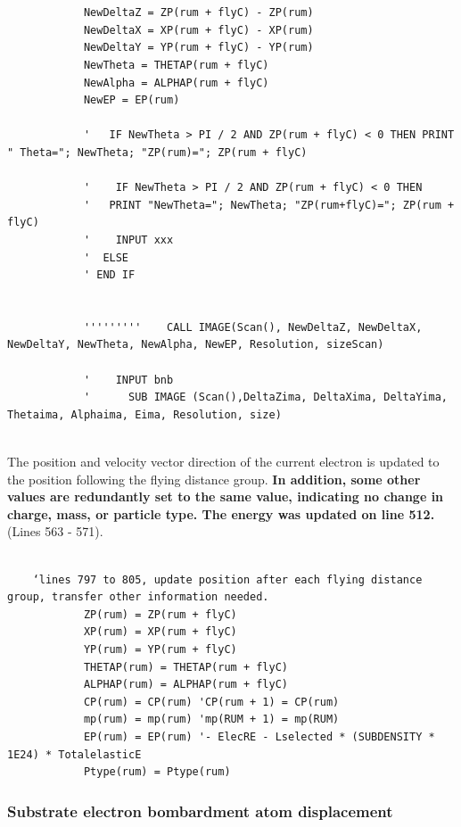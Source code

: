 \documentclass[10pt, reqno]{exam}
\begin{document}
\begin{verbatim}
    
    
            NewDeltaZ = ZP(rum + flyC) - ZP(rum)
            NewDeltaX = XP(rum + flyC) - XP(rum)
            NewDeltaY = YP(rum + flyC) - YP(rum)
            NewTheta = THETAP(rum + flyC)
            NewAlpha = ALPHAP(rum + flyC)
            NewEP = EP(rum)
    
            '   IF NewTheta > PI / 2 AND ZP(rum + flyC) < 0 THEN PRINT " Theta="; NewTheta; "ZP(rum)="; ZP(rum + flyC)
    
            '    IF NewTheta > PI / 2 AND ZP(rum + flyC) < 0 THEN
            '   PRINT "NewTheta="; NewTheta; "ZP(rum+flyC)="; ZP(rum + flyC)
            '    INPUT xxx
            '  ELSE
            ' END IF
    
    
            '''''''''    CALL IMAGE(Scan(), NewDeltaZ, NewDeltaX, NewDeltaY, NewTheta, NewAlpha, NewEP, Resolution, sizeScan)
    
            '    INPUT bnb
            '      SUB IMAGE (Scan(),DeltaZima, DeltaXima, DeltaYima, Thetaima, Alphaima, Eima, Resolution, size)
    
\end{verbatim}

The position and velocity vector direction of the current electron is updated to the position following the flying distance group. \textbf{In addition, some other values are redundantly set to the same value, indicating no change in charge, mass, or particle type. The energy was updated on line 512.} (Lines 563 - 571). 

\begin{verbatim}
            
    ‘lines 797 to 805, update position after each flying distance group, transfer other information needed.  
            ZP(rum) = ZP(rum + flyC)
            XP(rum) = XP(rum + flyC)
            YP(rum) = YP(rum + flyC)
            THETAP(rum) = THETAP(rum + flyC)
            ALPHAP(rum) = ALPHAP(rum + flyC)
            CP(rum) = CP(rum) 'CP(rum + 1) = CP(rum)
            mp(rum) = mp(rum) 'mp(RUM + 1) = mp(RUM)
            EP(rum) = EP(rum) '- ElecRE - Lselected * (SUBDENSITY * 1E24) * TotalelasticE
            Ptype(rum) = Ptype(rum)
\end{verbatim}

\subsubsection{Substrate electron bombardment atom displacement}
\end{document}
